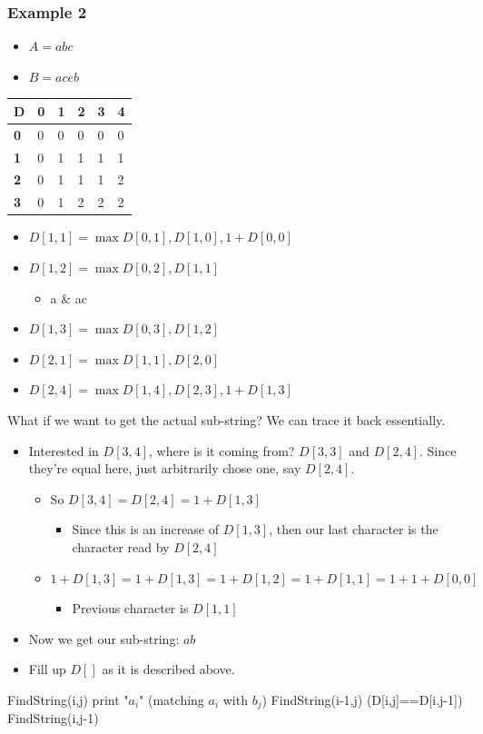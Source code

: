 \documentclass[11pt]{article}
\begin{document}
\subsubsection{Example 2}
\label{sec:org154d90b}
\begin{itemize}
\item \(A=abc\)
\item \(B=aceb\)
\end{itemize}
\begin{tabular}{l | l | l | l | l | l}
  \textbf{D} & \textbf{0} &\textbf{1} &\textbf{2} &\textbf{3}& \textbf{4}
  \\ \hline \textbf{0} & 0 & 0 & 0 & 0 & 0
  \\ \hline \textbf{1} & 0 & 1 & 1 & 1 & 1 
  \\ \hline \textbf{2} & 0 & 1 & 1 & 1 & 2
  \\ \hline \textbf{3} & 0 & 1 & 2 & 2 & 2
\end{tabular}
\begin{itemize}
\item \(D[1,1] = \max{D[0,1],D[1,0],1+D[0,0]}\)
\item \(D[1,2] = \max{D[0,2],D[1,1]}\)
\begin{itemize}
\item a \& ac
\end{itemize}
\item \(D[1,3] = \max{D[0,3],D[1,2]}\)
\item \(D[2,1] = \max{D[1,1],D[2,0]}\)
\item \(D[2,4] = \max{D[1,4],D[2,3],1+D[1,3]}\)
\end{itemize}
What if we want to get the actual sub-string? We can trace it back essentially. 
\begin{itemize}
\item Interested in \(D[3,4]\), where is it coming from? \(D[3,3]\) and \(D[2,4]\). Since they're equal here, just arbitrarily chose one, say \(D[2,4]\).
\begin{itemize}
\item So \(D[3,4]=D[2,4] = 1+D[1,3]\)
\begin{itemize}
\item Since this is an increase of \(D[1,3]\), then our last character is the character read by \(D[2,4]\)
\end{itemize}
\item \(1+D[1,3] = 1+D[1,3] = 1+D[1,2] =1+D[1,1]=1+1+D[0,0]\)
\begin{itemize}
\item Previous character is \(D[1,1]\)
\end{itemize}
\end{itemize}
\item Now we get our sub-string: \(ab\)
\item Fill up \(D[]\) as it is described above.
\end{itemize}
\begin{algorithmic}
\State FindString(i,j)
    \State print "$a_i$" (matching $a_i$ with $b_j$)
\Else
	    \State FindString(i-1,j)
	\Else (D[i,j]==D[i.j-1])
	      \State FindString(i,j-1)
	\EndIf
\EndIf
\end{algorithmic}
\end{document}

